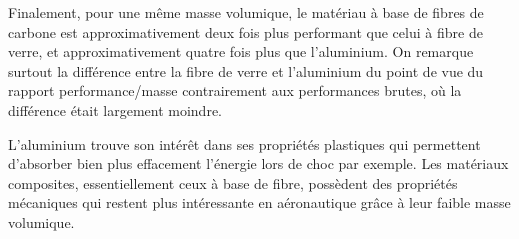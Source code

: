 Finalement, pour une même masse volumique, le matériau à base de fibres de carbone est approximativement deux fois plus performant que celui à fibre de verre, et approximativement quatre fois plus que l'aluminium.
On remarque surtout la différence entre la fibre de verre et l'aluminium du point de vue du rapport performance/masse contrairement aux performances brutes, où la différence était largement moindre.


L'aluminium trouve son intérêt dans ses propriétés plastiques qui permettent d'absorber bien plus effacement l'énergie lors de choc par exemple.
Les matériaux composites, essentiellement ceux à base de fibre, possèdent des propriétés mécaniques qui restent plus intéressante en aéronautique grâce à leur faible masse volumique.
